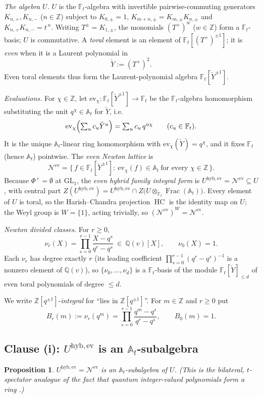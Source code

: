 \documentclass[11pt]{article}
\newtheorem{proposition}{Proposition}
\newcommand{\At}{\mathbb{A}_t}
\newcommand{\Ft}{\mathbb{F}_t}
\newcommand{\Nev}{\mathcal N^{\mathrm{ev}}}
\newcommand{\Uev}{U^{\mathrm{hyb,ev}}}
\newcommand{\HC}{\operatorname{HC}}
\newcommand{\Yc}{\check Y}
\newcommand{\Z}{\mathbb Z}
\newcommand{\ev}{\mathrm{ev}}
\begin{document}
\emph{The algebra $U$.}\;
$U$ is the $\Ft$-algebra with invertible pairwise-commuting generators
$K_{n,+},K_{n,-}$ ($n\in\Z$) subject to
$K_{0,\pm}=1$, $K_{m+n,\pm}=K_{m,\pm}K_{n,\pm}$ and $K_{n,+}K_{n,-}=t^{\,n}$.
Writing $T^{\pm}=K_{1,\pm}$, the monomials $(T^{+})^{w}$ ($w\in\Z$) form a
$\Ft$-basis; $U$ is commutative. A \emph{toral} element is an element of
$\Ft[(T^{+})^{\pm1}]$; it is \emph{even} when it is a Laurent polynomial in
\[
  \Yc:=(T^{+})^{2}.
\]
Even toral elements thus form the Laurent-polynomial algebra
$\Ft[\Yc^{\pm1}]$.

\emph{Evaluations.}\;
For $\chi\in\Z$, let $\ev_\chi\colon\Ft[\Yc^{\pm1}]\to\Ft$ be the
$\Ft$-algebra homomorphism substituting the unit $q^{\chi}\in\At$ for $\Yc$,
i.e.
\[
  \ev_\chi\Bigl(\textstyle\sum_{u}c_u\Yc^{u}\Bigr)=\sum_u c_u\,q^{u\chi}
  \qquad(c_u\in\Ft).
\]
It is the unique $\At$-linear ring homomorphism with $\ev_\chi(\Yc)=q^{\chi}$,
and it fixes $\Ft$ (hence $\At$) pointwise. The \emph{even Newton lattice} is
\[
  \Nev=\bigl\{\,f\in\Ft[\Yc^{\pm1}]:\ \ev_\chi(f)\in\At\ \text{for every }
  \chi\in\Z\,\bigr\}.
\]
Because $\Phi^{+}=\emptyset$ at $\mathrm{GL}_1$, the \emph{even hybrid family integral
form} is $\Uev=\Nev\subseteq U$, with central part
$Z(\Uev)=\Uev\cap Z\bigl(U\otimes_{\Ft}\operatorname{Frac}(\At)\bigr)$. Every
element of $U$ is toral, so the Harish--Chandra projection $\HC$ is the identity
map on $U$; the Weyl group is $W=\{1\}$, acting trivially, so
$(\Nev)^{W}=\Nev$.

\emph{Newton divided classes.}\;
For $r\ge0$,
\[
  \nu_{r}(X)=\prod_{s=0}^{r-1}\frac{X-q^{s}}{q^{r}-q^{s}}\ \in\ \mathbb Q(v)[X],
  \qquad \nu_0(X)=1 .
\]
Each $\nu_r$ has degree exactly $r$ (its leading coefficient
$\prod_{s=0}^{r-1}(q^{r}-q^{s})^{-1}$ is a nonzero element of $\mathbb Q(v)$),
so $\{\nu_0,\dots,\nu_d\}$ is a $\Ft$-basis of the module
$\Ft[\Yc]_{\le d}$ of even toral polynomials of degree $\le d$.

\medskip
We write $\Z[q^{\pm1}]$-\emph{integral} for ``lies in $\Z[q^{\pm1}]$''.
For $m\in\Z$ and $r\ge0$ put
\[
  B_r(m):=\nu_r(q^{m})=\prod_{s=0}^{r-1}\frac{q^{m}-q^{s}}{q^{r}-q^{s}},
  \qquad B_0(m)=1 .
\]

\subsection{Clause (i): $\Uev$ is an $\At$-subalgebra}

\begin{proposition}
$\Uev=\Nev$ is an $\At$-subalgebra of $U$. (This is the bilateral,
$t$-spectator analogue of the fact that quantum integer-valued polynomials
form a ring \cite[\S1]{HarmanHopkins}.)
\end{proposition}
\end{document}

